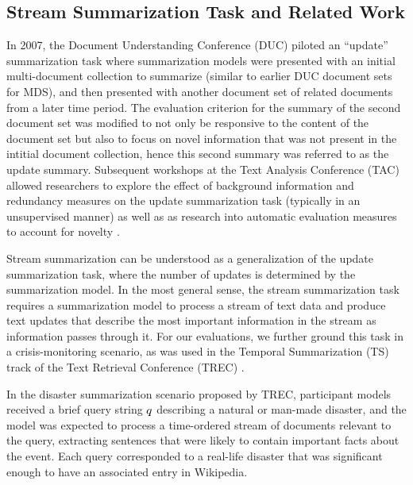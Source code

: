\subsection{Stream Summarization Task and Related Work}

In 2007, the Document Understanding Conference (DUC) piloted an ``update'' 
summarization task \citep{dang2008overview} where summarization models
were presented with an initial multi-document collection
to summarize (similar to earlier DUC document sets for MDS), and then
presented with another document set of related documents from a later time
period. The evaluation criterion for the summary of the second 
document set was modified to not only be responsive to the content of the
document set but also to focus on novel information that was not present in 
the intitial document collection, hence this second summary was referred to
as the update summary. Subsequent workshops at the Text Analysis Conference
(TAC) allowed researchers to explore the effect of background information
and redundancy measures on the update summarization task (typically in an
unsupervised manner) 
\citep{chen2008tsinghua,he2008hitir,mohammad2008multiple,zhang2008ictcas} as well as as research
into automatic evaluation measures to account for novelty 
\citep{conroy2011nouveau}.

Stream summarization can be understood as a generalization of the update
summarization task, where the number of updates is determined by the 
summarization model.
In the most general sense, the stream summarization task requires a 
summarization model to process a stream of text data and produce text updates
that describe the most important information in the
stream as information passes through it. 
For our evaluations, we further ground this task in a crisis-monitoring
scenario, as was used in the Temporal Summarization (TS) track 
of the Text Retrieval Conference (TREC)
\citep{aslam2015trec,aslam2016trec}.

In the disaster summarization scenario proposed by TREC,
 participant models received a brief query string 
$q{}$ describing a natural or man-made disaster, and the model was 
expected to process a time-ordered stream of documents relevant to the query, 
extracting sentences that were likely to contain important facts about the
event. Each query corresponded to a real-life disaster that was significant
enough to have an associated entry in Wikipedia. 







